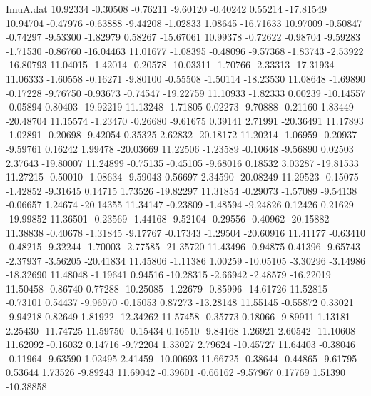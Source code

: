 \begin{filecontents}{ImuA.dat}
  10.92334   -0.30508   -0.76211   -9.60120   -0.40242    0.55214  -17.81549
  10.94704   -0.47976   -0.63888   -9.44208   -1.02833    1.08645  -16.71633
  10.97009   -0.50847   -0.74297   -9.53300   -1.82979    0.58267  -15.67061
  10.99378   -0.72622   -0.98704   -9.59283   -1.71530   -0.86760  -16.04463
  11.01677   -1.08395   -0.48096   -9.57368   -1.83743   -2.53922  -16.80793
  11.04015   -1.42014   -0.20578  -10.03311   -1.70766   -2.33313  -17.31934
  11.06333   -1.60558   -0.16271   -9.80100   -0.55508   -1.50114  -18.23530
  11.08648   -1.69890   -0.17228   -9.76750   -0.93673   -0.74547  -19.22759
  11.10933   -1.82333    0.00239  -10.14557   -0.05894    0.80403  -19.92219
  11.13248   -1.71805    0.02273   -9.70888   -0.21160    1.83449  -20.48704
  11.15574   -1.23470   -0.26680   -9.61675    0.39141    2.71991  -20.36491
  11.17893   -1.02891   -0.20698   -9.42054    0.35325    2.62832  -20.18172
  11.20214   -1.06959   -0.20937   -9.59761    0.16242    1.99478  -20.03669
  11.22506   -1.23589   -0.10648   -9.56890    0.02503    2.37643  -19.80007
  11.24899   -0.75135   -0.45105   -9.68016    0.18532    3.03287  -19.81533
  11.27215   -0.50010   -1.08634   -9.59043    0.56697    2.34590  -20.08249
  11.29523   -0.15075   -1.42852   -9.31645    0.14715    1.73526  -19.82297
  11.31854   -0.29073   -1.57089   -9.54138   -0.06657    1.24674  -20.14355
  11.34147   -0.23809   -1.48594   -9.24826    0.12426    0.21629  -19.99852
  11.36501   -0.23569   -1.44168   -9.52104   -0.29556   -0.40962  -20.15882
  11.38838   -0.40678   -1.31845   -9.17767   -0.17343   -1.29504  -20.60916
  11.41177   -0.63410   -0.48215   -9.32244   -1.70003   -2.77585  -21.35720
  11.43496   -0.94875    0.41396   -9.65743   -2.37937   -3.56205  -20.41834
  11.45806   -1.11386    1.00259  -10.05105   -3.30296   -3.14986  -18.32690
  11.48048   -1.19641    0.94516  -10.28315   -2.66942   -2.48579  -16.22019
  11.50458   -0.86740    0.77288  -10.25085   -1.22679   -0.85996  -14.61726
  11.52815   -0.73101    0.54437   -9.96970   -0.15053    0.87273  -13.28148
  11.55145   -0.55872    0.33021   -9.94218    0.82649    1.81922  -12.34262
  11.57458   -0.35773    0.18066   -9.89911    1.13181    2.25430  -11.74725
  11.59750   -0.15434    0.16510   -9.84168    1.26921    2.60542  -11.10608
  11.62092   -0.16032    0.14716   -9.72204    1.33027    2.79624  -10.45727
  11.64403   -0.38046   -0.11964   -9.63590    1.02495    2.41459  -10.00693
  11.66725   -0.38644   -0.44865   -9.61795    0.53644    1.73526   -9.89243
  11.69042   -0.39601   -0.66162   -9.57967    0.17769    1.51390  -10.38858

\end{filecontents}
